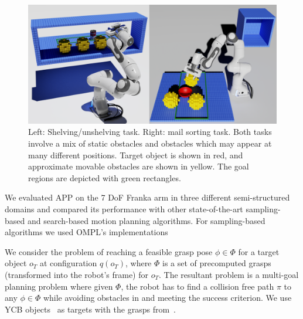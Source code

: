 \documentclass[a4paper]{report}
\begin{document}
\begin{figure}
\centering
\includegraphics[width=\textwidth]{figs/app_fig3_v2_lo-res.png}
\caption{Left: Shelving/unshelving task. Right: mail sorting task. Both tasks involve a mix of static obstacles and obstacles which may appear at many different positions. Target object is shown in red, and approximate movable obstacles are shown in yellow. The goal regions are depicted with green rectangles.}
\label{fig:scenarios}
\end{figure}

We evaluated APP on the 7 DoF Franka arm in three different semi-structured domains and compared its performance with other state-of-the-art sampling-based and search-based motion planning algorithms. For sampling-based algorithms we used OMPL's implementations~\cite{sucan2012open}

We consider the problem of reaching a feasible grasp pose $\phi \in \Phi$ for a target object $o_T$ at configuration $q(o_T)$, where $\Phi$ is a set of precomputed grasps (transformed into the robot's frame) for $o_T$. The resultant problem is a multi-goal planning problem where given $\Phi$, the robot has to find a collision free path $\pi$ to any $\phi \in \Phi$ while avoiding obstacles in \calW and meeting the success criterion. We use YCB objects~\cite{calli2015ycb} as targets with the grasps from~\cite{eppner2019billion}.
\end{document}
